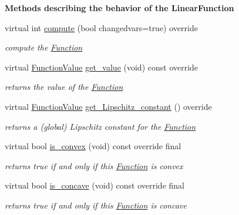 \begin{Indent}\textbf{ Methods describing the behavior of the Linear\+Function}\par
\begin{DoxyCompactItemize}
\item 
virtual int \mbox{\hyperlink{class_s_m_spp__di__unipi__it_1_1_linear_function_afc8ff54ab05d22f4cca0fb0bfbeb7a49}{compute}} (bool changedvars=true) override
\begin{DoxyCompactList}\small\item\em compute the \mbox{\hyperlink{class_s_m_spp__di__unipi__it_1_1_function}{Function}} \end{DoxyCompactList}\item 
virtual \mbox{\hyperlink{class_s_m_spp__di__unipi__it_1_1_function_a9ad432406b609e28d340f73e9474bffe}{Function\+Value}} \mbox{\hyperlink{class_s_m_spp__di__unipi__it_1_1_linear_function_ae74d8c7f3dc6100820de31198c77ca25}{get\+\_\+value}} (void) const override
\begin{DoxyCompactList}\small\item\em returns the value of the \mbox{\hyperlink{class_s_m_spp__di__unipi__it_1_1_function}{Function}} \end{DoxyCompactList}\item 
virtual \mbox{\hyperlink{class_s_m_spp__di__unipi__it_1_1_function_a9ad432406b609e28d340f73e9474bffe}{Function\+Value}} \mbox{\hyperlink{class_s_m_spp__di__unipi__it_1_1_linear_function_a4f76a73bde6d436526ea03959f886105}{get\+\_\+\+Lipschitz\+\_\+constant}} () override
\begin{DoxyCompactList}\small\item\em returns a (global) Lipschitz constant for the \mbox{\hyperlink{class_s_m_spp__di__unipi__it_1_1_function}{Function}} \end{DoxyCompactList}\item 
virtual bool \mbox{\hyperlink{class_s_m_spp__di__unipi__it_1_1_linear_function_a13b81428d5637e56d77e2168ab66ea44}{is\+\_\+convex}} (void) const override final
\begin{DoxyCompactList}\small\item\em returns true if and only if this \mbox{\hyperlink{class_s_m_spp__di__unipi__it_1_1_function}{Function}} is convex \end{DoxyCompactList}\item 
virtual bool \mbox{\hyperlink{class_s_m_spp__di__unipi__it_1_1_linear_function_ac5169a9ee09d66d4e9078d0350ea9142}{is\+\_\+concave}} (void) const override final
\begin{DoxyCompactList}\small\item\em returns true if and only if this \mbox{\hyperlink{class_s_m_spp__di__unipi__it_1_1_function}{Function}} is concave \end{DoxyCompactList}\item 

\end{DoxyCompactItemize}
\end{Indent}
